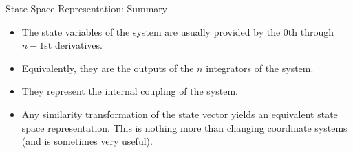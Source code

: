 \begin{frame}
State Space Representation:  Summary
 \begin{itemize}
 \item The state variables of the system are usually provided by
 the 0th through $n-1$st derivatives.
 \item Equivalently, they are the outputs of the $n$ integrators of
 the system.
 \item They represent the internal coupling of the system.
 \item Any similarity transformation of the state vector yields an
 equivalent state space representation.  This is nothing more than
 changing coordinate systems (and is sometimes very useful).
\end{itemize}
\end{frame}

